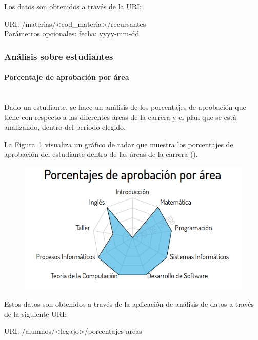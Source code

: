 Los datos son obtenidos a través de la URI:

URI: /materias/<cod\_materia>/recursantes \\

Parámetros opcionales: fecha: yyyy-mm-dd


\subsubsection{Análisis sobre estudiantes}

\paragraph{Porcentaje de aprobación por área}\mbox{}\\

Dado un estudiante, se hace un análisis de los porcentajes de aprobación que tiene con respecto a las diferentes áreas de la carrera y el plan que se está analizando, dentro del período elegido.

La Figura~\ref{fig:sa-porcentaje-area} visualiza un gráfico de radar que muestra los porcentajes de aprobación del estudiante dentro de las áreas de la carrera ().

\begin{figure}[H]
  \centering
    \includegraphics[scale=0.4]{images/seguimiento-academico/sa-porcentajesarea.png}
  \label{fig:sa-porcentaje-area}
\end{figure}

Estos datos son obtenidos a través de la aplicación de análisis de datos a través de la siguiente URI:

URI: /alumnos/<legajo>/porcentajes-areas \\

